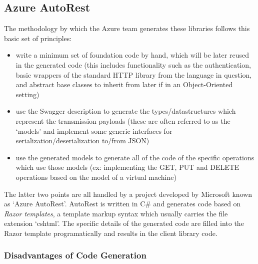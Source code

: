 \documentclass[11pt]{report}
\begin{document}
\subsection{Azure AutoRest}

The methodology by which the Azure team generates these libraries follows this
basic set of principles:

\begin{itemize}
    \item{} write a minimum set of foundation code by hand, which will be later
        reused in the generated code (this includes functionality such as the
        authentication, basic wrappers of the standard HTTP library from the
        language in question, and abstract base classes to inherit from later if
        in an Object-Oriented setting)
    \item{} use the Swagger description to generate the types/datastructures
        which represent the transmission payloads (these are often referred to
        as the `models' and implement some generic interfaces for
        serialization/deserialization to/from JSON)
    \item{} use the generated models to generate all of the code of the
        specific operations which use those models (ex: implementing the
        GET, PUT and DELETE operations based on the model of a virtual machine)
\end{itemize}

The latter two points are all handled by a project developed by Microsoft known
as `Azure AutoRest'. AutoRest is written in C\# and generates code based on
\textit{Razor templates}, a template markup syntax which usually carries the
file extension `cshtml'. The specific details of the generated code are filled
into the Razor template programatically and results in the client library code.

\subsubsection{Disadvantages of Code Generation}
\end{document}
